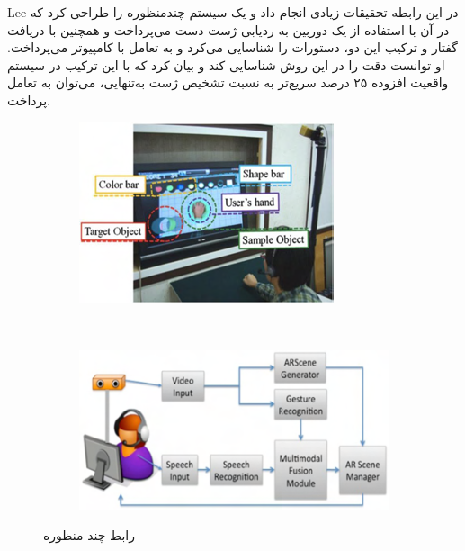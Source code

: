 Lee در این رابطه تحقیقات زیادی انجام داد و یک سیستم چندمنظوره را طراحی کرد که در آن با استفاده از یک دوربین به  ردیابی ژست دست می‌پرداخت و همچنین با دریافت گفتار و ترکیب این دو، دستورات را شناسایی می‌کرد و به تعامل با کامپیوتر می‌پرداخت.
او توانست دقت را در این روش شناسایی کند و بیان کرد که با این ترکیب در سیستم واقعیت افزوده ۲۵ درصد سریع‌تر به نسبت تشخیص ژست به‌تنهایی، می‌توان به تعامل پرداخت\cite{Lee2}.
\begin{figure}[!ht]
	\centering
	\begin{subfigure}[b]{0.5\textwidth}
		\includegraphics[width=\textwidth]{image/lee2}
		
		
	\end{subfigure}
	~ %
	\begin{subfigure}[b]{0.4\textwidth}
		\includegraphics[width=\textwidth]{image/lee1}
		
	\end{subfigure}
	\caption{رابط چند منظوره\cite{Lee2}}\label{fig:lee2}
\end{figure}

